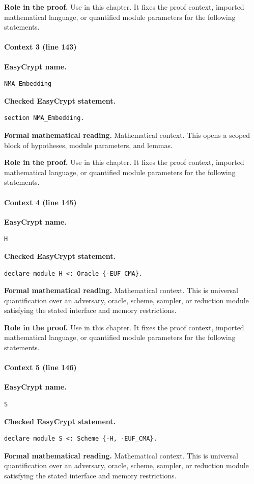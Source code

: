 \noindent\textbf{Role in the proof.}
Use in this chapter. It fixes the proof context, imported mathematical language, or quantified module parameters for the following statements.

\paragraph{Context 3 (line 143)}
\noindent\textbf{EasyCrypt name.}
\begin{lstlisting}[language=EasyCrypt,basicstyle=\ttfamily\scriptsize]
NMA_Embedding
\end{lstlisting}
\noindent\textbf{Checked EasyCrypt statement.}
\begin{lstlisting}[language=EasyCrypt,basicstyle=\ttfamily\scriptsize]
section NMA_Embedding.
\end{lstlisting}
\noindent\textbf{Formal mathematical reading.}
Mathematical context. This opens a scoped block of hypotheses, module parameters, and lemmas.

\noindent\textbf{Role in the proof.}
Use in this chapter. It fixes the proof context, imported mathematical language, or quantified module parameters for the following statements.

\paragraph{Context 4 (line 145)}
\noindent\textbf{EasyCrypt name.}
\begin{lstlisting}[language=EasyCrypt,basicstyle=\ttfamily\scriptsize]
H
\end{lstlisting}
\noindent\textbf{Checked EasyCrypt statement.}
\begin{lstlisting}[language=EasyCrypt,basicstyle=\ttfamily\scriptsize]
declare module H <: Oracle {-EUF_CMA}.
\end{lstlisting}
\noindent\textbf{Formal mathematical reading.}
Mathematical context. This is universal quantification over an adversary, oracle, scheme, sampler, or reduction module satisfying the stated interface and memory restrictions.

\noindent\textbf{Role in the proof.}
Use in this chapter. It fixes the proof context, imported mathematical language, or quantified module parameters for the following statements.

\paragraph{Context 5 (line 146)}
\noindent\textbf{EasyCrypt name.}
\begin{lstlisting}[language=EasyCrypt,basicstyle=\ttfamily\scriptsize]
S
\end{lstlisting}
\noindent\textbf{Checked EasyCrypt statement.}
\begin{lstlisting}[language=EasyCrypt,basicstyle=\ttfamily\scriptsize]
declare module S <: Scheme {-H, -EUF_CMA}.
\end{lstlisting}
\noindent\textbf{Formal mathematical reading.}
Mathematical context. This is universal quantification over an adversary, oracle, scheme, sampler, or reduction module satisfying the stated interface and memory restrictions.

